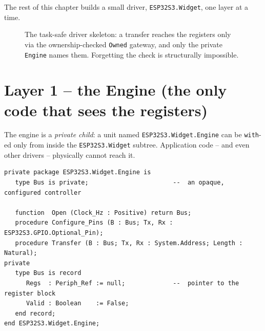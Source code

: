 The rest of this chapter builds a small driver, \texttt{ESP32S3.Widget}, one layer
at a time.

\begin{figure}[ht]
\centering
{}
\caption{The task-safe driver skeleton: a transfer reaches the registers only via
the ownership-checked \texttt{Owned} gateway, and only the private \texttt{Engine}
names them. Forgetting the check is structurally impossible.}
\label{fig:driver-skeleton}
\end{figure}

\section{Layer 1 -- the Engine (the only code that sees the registers)}

The engine is a \emph{private child}: a unit named \texttt{ESP32S3.Widget.Engine}
can be \texttt{with}-ed only from inside the \texttt{ESP32S3.Widget} subtree.
Application code -- and even other drivers -- physically cannot reach it.

\begin{lstlisting}
private package ESP32S3.Widget.Engine is
   type Bus is private;                       --  an opaque, configured controller

   function  Open (Clock_Hz : Positive) return Bus;
   procedure Configure_Pins (B : Bus; Tx, Rx : ESP32S3.GPIO.Optional_Pin);
   procedure Transfer (B : Bus; Tx, Rx : System.Address; Length : Natural);
private
   type Bus is record
      Regs  : Periph_Ref := null;             --  pointer to the register block
      Valid : Boolean    := False;
   end record;
end ESP32S3.Widget.Engine;
\end{lstlisting}


